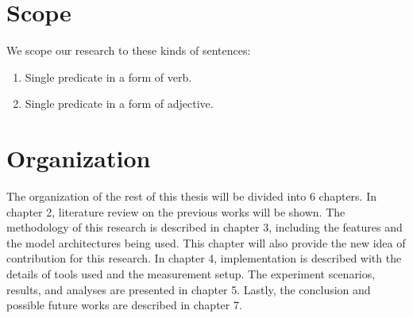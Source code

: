 \section{Scope}
We scope our research to these kinds of sentences:
\begin{enumerate}
	\item Single predicate in a form of verb.
	\item Single predicate in a form of adjective.
\end{enumerate}

\section{Organization}
The organization of the rest of this thesis will be divided into 6 chapters. In chapter 2, literature review on the previous works will be shown. The methodology of this research is described in chapter 3, including the features and the model architectures being used. This chapter will also provide the new idea of contribution for this research. In chapter 4, implementation is described with the details of tools used and the measurement setup. The experiment scenarios, results, and analyses are presented in chapter 5. Lastly, the conclusion and possible future works are described in chapter 7.


